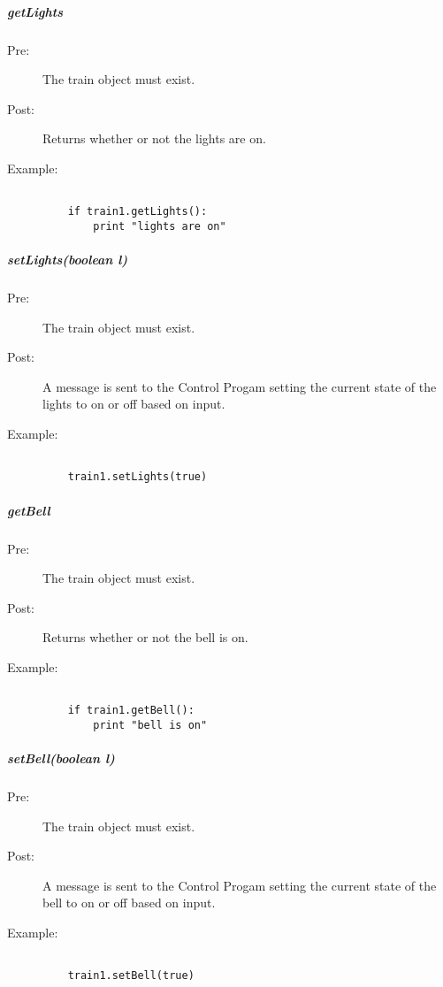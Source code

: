 \documentclass[a4paper,11pt,notitlepage]{article}
\def\CS{Control Progam\xspace}
\begin{document}
\subparagraph{getLights}
\begin{description}
\item[\hspace{1cm}Pre:] The train object must exist. 
\item[\hspace{1cm}Post:] Returns whether or not the lights are on.
\item[\hspace{1cm}Example:]
\begin{verbatim}

    if train1.getLights():
        print "lights are on"
\end{verbatim}
\end{description}

\subparagraph{setLights(boolean l)} 
\begin{description}
\item[\hspace{1cm}Pre:] The train object must exist.
\item[\hspace{1cm}Post:] A message is sent to the \CS setting the current state of the lights to on or off based on input.
\item[\hspace{1cm}Example:]
\begin{verbatim}

    train1.setLights(true)
\end{verbatim}
\end{description}

\subparagraph{getBell} 
\begin{description}
\item[\hspace{1cm}Pre:] The train object must exist. 
\item[\hspace{1cm}Post:] Returns whether or not the bell is on.
\item[\hspace{1cm}Example:]
\begin{verbatim}

    if train1.getBell():
        print "bell is on"
\end{verbatim}
\end{description}

\subparagraph{setBell(boolean l)} 
\begin{description}
\item[\hspace{1cm}Pre:] The train object must exist. 
\item[\hspace{1cm}Post:] A message is sent to the \CS setting the current state of the bell to on or off based on input.
\item[\hspace{1cm}Example:]
\begin{verbatim}

    train1.setBell(true)
\end{verbatim}
\end{description}
\end{document}
